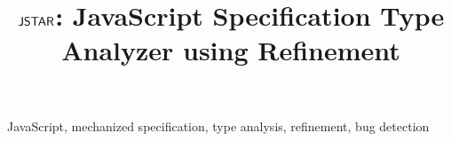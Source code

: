 \documentclass[10pt,conference]{IEEEtran}
\begin{document}
\title{$\textsf{JSTAR}$: JavaScript Specification Type Analyzer using Refinement}

\author{}
% 
% 
% 
% 
% 
% 
% 
% 

\maketitle



\begin{IEEEkeywords}
JavaScript, mechanized specification, type analysis, refinement, bug detection
\end{IEEEkeywords}











\end{document}

